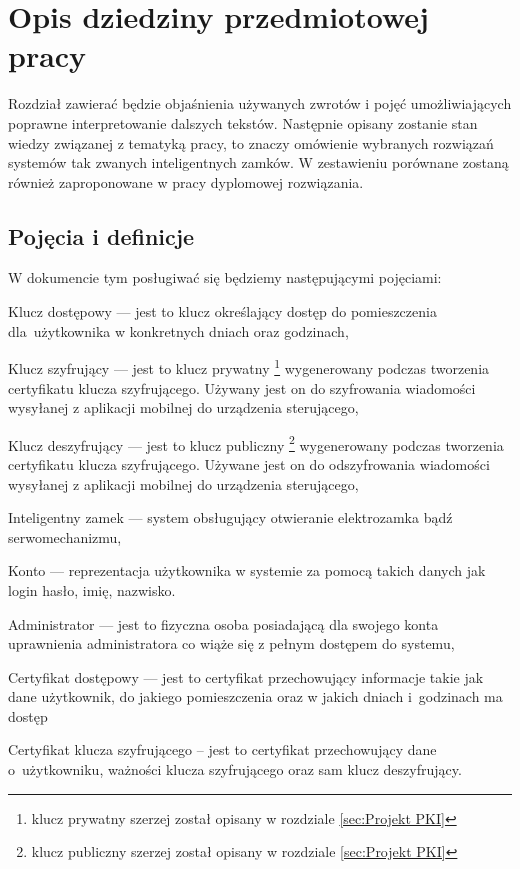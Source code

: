 % 
\newpage
\section{Opis dziedziny przedmiotowej pracy}\label{sec:dziedzina}
Rozdział zawierać będzie objaśnienia używanych zwrotów i pojęć umożliwiających poprawne interpretowanie dalszych tekstów. Następnie opisany zostanie stan wiedzy związanej z tematyką pracy, to znaczy omówienie wybranych rozwiązań systemów tak zwanych inteligentnych zamków. W zestawieniu porównane zostaną również zaproponowane w pracy dyplomowej rozwiązania.
\subsection{Pojęcia i definicje}\label{sec:Pojęcia i definicje}
W dokumencie tym posługiwać się będziemy następującymi pojęciami:
\begin{itemize*}
	\item {Klucz dostępowy} --- jest to  klucz określający dostęp do pomieszczenia dla~użytkownika w konkretnych dniach oraz godzinach,
	\item {Klucz szyfrujący} 
	--- jest to klucz prywatny \footnote{ klucz prywatny szerzej został opisany w rozdziale \ref{sec:Projekt PKI}} wygenerowany podczas tworzenia certyfikatu klucza szyfrującego. Używany jest on do szyfrowania wiadomości wysyłanej z aplikacji mobilnej do urządzenia sterującego,
	\item {Klucz deszyfrujący }
	--- jest to klucz publiczny \footnote{ klucz publiczny szerzej został opisany w rozdziale \ref{sec:Projekt PKI}} wygenerowany podczas tworzenia certyfikatu klucza szyfrującego. Używane jest on do odszyfrowania wiadomości wysyłanej z aplikacji mobilnej do urządzenia sterującego,
	\item {Inteligentny zamek}
	--- system obsługujący otwieranie elektrozamka bądź serwomechanizmu,
	\item {Konto}
	--- reprezentacja użytkownika w systemie za pomocą takich danych jak login hasło, imię, nazwisko.
	\item {Administrator}
	--- jest to fizyczna osoba posiadającą dla swojego konta uprawnienia administratora co wiąże się z pełnym dostępem do systemu,
	\item {Certyfikat dostępowy}
	--- jest to certyfikat przechowujący informacje takie jak dane użytkownik, do jakiego pomieszczenia oraz w jakich dniach i~godzinach	ma dostęp
	\item {Certyfikat klucza szyfrującego}
	-- jest to certyfikat przechowujący dane o~użytkowniku, ważności klucza szyfrującego oraz sam klucz deszyfrujący.
\end{itemize*}

